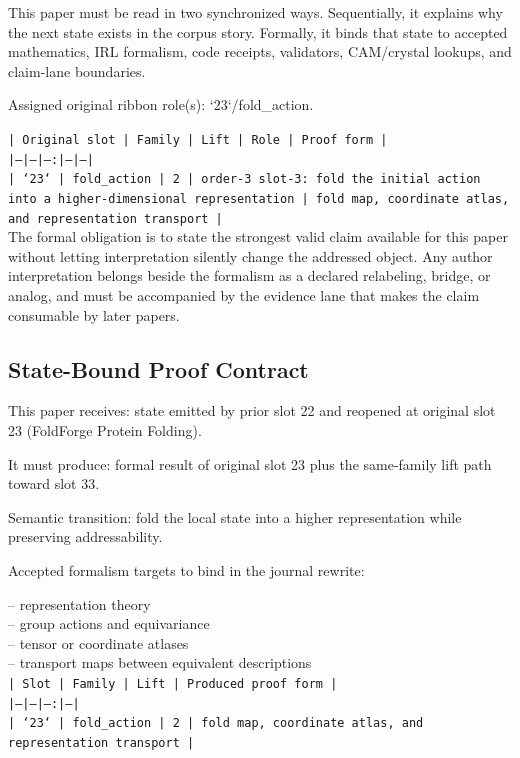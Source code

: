 \documentclass[11pt]{article}
\begin{document}
This paper must be read in two synchronized ways. Sequentially, it explains why
the next state exists in the corpus story. Formally, it binds that state to
accepted mathematics, IRL formalism, code receipts, validators, CAM/crystal
lookups, and claim-lane boundaries.

Assigned original ribbon role(s): `23`/fold\_action.

\noindent\texttt{| Original slot | Family | Lift | Role | Proof form |}\\
\noindent\texttt{|---|---|---:|---|---|}\\
\noindent\texttt{| `23` | fold\_action | 2 | order-3 slot-3: fold the initial action into a higher-dimensional representation | fold map, coordinate atlas, and representation transport |}\\

The formal obligation is to state the strongest valid claim available for this
paper without letting interpretation silently change the addressed object. Any
author interpretation belongs beside the formalism as a declared relabeling,
bridge, or analog, and must be accompanied by the evidence lane that makes the
claim consumable by later papers.

\subsection*{State-Bound Proof Contract}

This paper receives: state emitted by prior slot 22 and reopened at original slot 23 (FoldForge Protein Folding).

It must produce: formal result of original slot 23 plus the same-family lift path toward slot 33.

Semantic transition: fold the local state into a higher representation while preserving addressability.

Accepted formalism targets to bind in the journal rewrite:

\noindent{}-- representation theory\\
\noindent{}-- group actions and equivariance\\
\noindent{}-- tensor or coordinate atlases\\
\noindent{}-- transport maps between equivalent descriptions\\

\noindent\texttt{| Slot | Family | Lift | Produced proof form |}\\
\noindent\texttt{|---|---|---:|---|}\\
\noindent\texttt{| `23` | fold\_action | 2 | fold map, coordinate atlas, and representation transport |}\\
\end{document}
